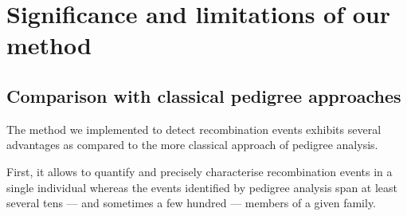 
%
%


\section{Significance and limitations of our method}
\subsection{Comparison with classical pedigree approaches}

The method we implemented to detect recombination events exhibits several advantages as compared to the more classical approach of pedigree analysis.

First, it allows to quantify and precisely characterise recombination events in a single individual whereas the events identified by pedigree analysis span at least several tens — and sometimes a few hundred — members of a given family.

